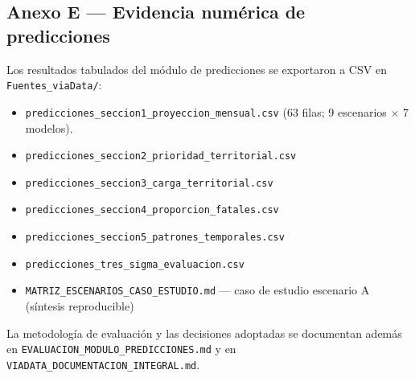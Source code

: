 \subsection{Anexo E — Evidencia numérica de predicciones}

Los resultados tabulados del módulo de predicciones se exportaron a CSV en \texttt{Fuentes\_viaData/}:

\begin{itemize}
	\item \texttt{predicciones\_seccion1\_proyeccion\_mensual.csv} (63 filas; 9 escenarios $\times$ 7 modelos).
	\item \texttt{predicciones\_seccion2\_prioridad\_territorial.csv}
	\item \texttt{predicciones\_seccion3\_carga\_territorial.csv}
	\item \texttt{predicciones\_seccion4\_proporcion\_fatales.csv}
	\item \texttt{predicciones\_seccion5\_patrones\_temporales.csv}
	\item \texttt{predicciones\_tres\_sigma\_evaluacion.csv}
	\item \texttt{MATRIZ\_ESCENARIOS\_CASO\_ESTUDIO.md} — caso de estudio escenario A (síntesis reproducible)
\end{itemize}

La metodología de evaluación y las decisiones adoptadas se documentan además en \texttt{EVALUACION\_MODULO\_PREDICCIONES.md} y en \texttt{VIADATA\_DOCUMENTACION\_INTEGRAL.md}.
